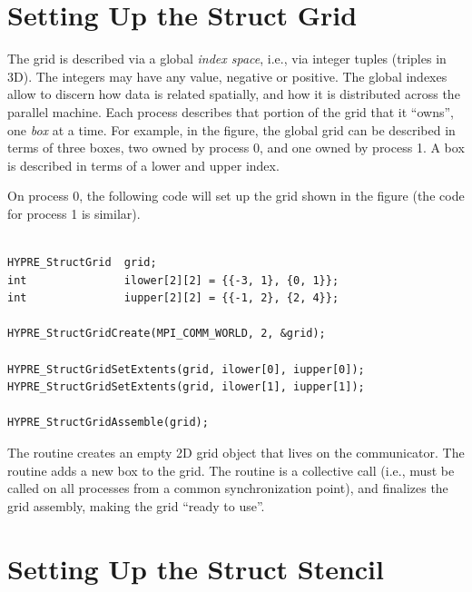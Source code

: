 
\section{Setting Up the Struct Grid}
\label{Setting Up the Struct Grid}

The grid is described via a global {\em index space}, i.e., via
integer tuples (triples in 3D).  The integers may have any value,
negative or positive.  The global indexes allow \hypre{} to discern
how data is related spatially, and how it is distributed across the
parallel machine.  Each process describes that portion of the grid
that it ``owns'', one {\em box} at a time.  For example, in the
figure, the global grid can be described in terms of three boxes, two
owned by process 0, and one owned by process 1.  A box is described in
terms of a lower and upper index.

On process 0, the following code will set up the grid shown in the
figure (the code for process 1 is similar).
\begin{display}
\begin{verbatim}

HYPRE_StructGrid  grid;
int               ilower[2][2] = {{-3, 1}, {0, 1}};
int               iupper[2][2] = {{-1, 2}, {2, 4}};

HYPRE_StructGridCreate(MPI_COMM_WORLD, 2, &grid);

HYPRE_StructGridSetExtents(grid, ilower[0], iupper[0]);
HYPRE_StructGridSetExtents(grid, ilower[1], iupper[1]);

HYPRE_StructGridAssemble(grid);

\end{verbatim}
\end{display}
The  routine creates an empty 2D grid object that lives
on the  communicator.  The 
routine adds a new box to the grid.  The  routine is
a collective call (i.e., must be called on all processes from a common
synchronization point), and finalizes the grid assembly, making the
grid ``ready to use''.


\section{Setting Up the Struct Stencil}
\label{Setting Up the Struct Stencil}

